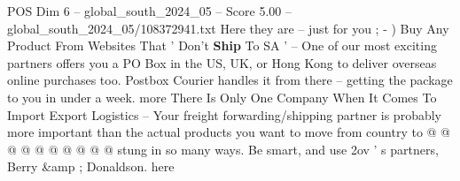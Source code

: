 \begin{textsample}{POS Dim 6 – global\_south\_2024\_05 – Score 5.00 – global\_south\_2024\_05/108372941.txt}
Here they are -- just for you ; - ) Buy Any Product From Websites That ' Don't \textbf{Ship} To SA ' -- One of our most exciting partners offers you a PO Box in the US, UK, or Hong Kong to deliver overseas online purchases too.
Postbox Courier handles it from there -- getting the package to you in under a week. more There Is Only One Company When It Comes To Import Export Logistics -- Your freight forwarding/shipping partner is probably more important than the actual products you want to move from country to @ @ @ @ @ @ @ @ @ @ stung in so many ways.
Be smart, and use 2ov ' s partners, Berry \&amp ; Donaldson. here

\end{textsample}
